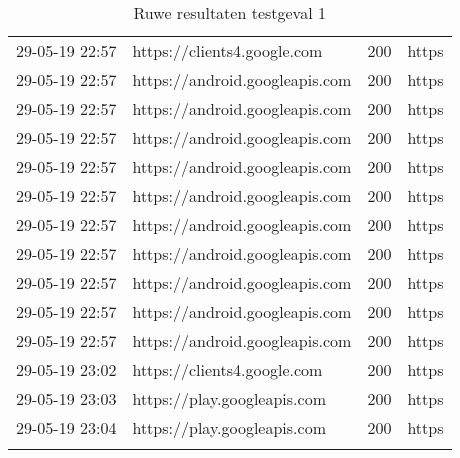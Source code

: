 \begin{longtable}[c]{@{}llll@{}}
    29-05-19 22:57 & https://clients4.google.com & 200 & https \\
    29-05-19 22:57 & https://android.googleapis.com & 200 & https \\
    29-05-19 22:57 & https://android.googleapis.com & 200 & https \\
    29-05-19 22:57 & https://android.googleapis.com & 200 & https \\
    29-05-19 22:57 & https://android.googleapis.com & 200 & https \\
    29-05-19 22:57 & https://android.googleapis.com & 200 & https \\
    29-05-19 22:57 & https://android.googleapis.com & 200 & https \\
    29-05-19 22:57 & https://android.googleapis.com & 200 & https \\
    29-05-19 22:57 & https://android.googleapis.com & 200 & https \\
    29-05-19 22:57 & https://android.googleapis.com & 200 & https \\
    29-05-19 22:57 & https://android.googleapis.com & 200 & https \\
    29-05-19 23:02 & https://clients4.google.com & 200 & https \\
    29-05-19 23:03 & https://play.googleapis.com & 200 & https \\
    29-05-19 23:04 & https://play.googleapis.com & 200 & https \\* \bottomrule
    \caption{Ruwe resultaten testgeval 1}
    \label{tab:rawesults-1}\\
\end{longtable}